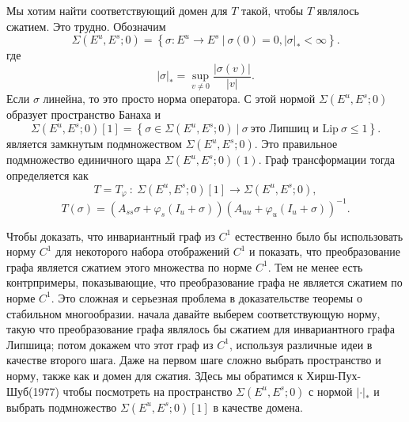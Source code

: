 \begin{demo}
Мы хотим найти соответствующий домен для $T$ такой, чтобы $T$ являлось сжатием. Это трудно. Обозначим
$$
\Sigma(E^u,E^s;0) = \left\{ \sigma: E^u \rightarrow E^s \ | \  \sigma (0) = 0, |\sigma|_* < \infty \right\}.
$$
где 
$$
| \sigma |_* = \sup\limits_{v \neq 0} \frac{|\sigma(v)|}{|v|}.
$$
Если $\sigma$ линейна, то это просто норма оператора. С этой нормой $\Sigma(E^u,E^s;0)$ образует пространство Банаха и
$$
\Sigma(E^u,E^s;0)[1]=\left\{\sigma \in \Sigma(E^u,E^s;0) \ | \ \sigma \ \textrm{это Липшиц и Lip} \ \sigma \leqslant 1 \right\}.
$$
является замкнутым подмножеством $\Sigma(E^u,E^s;0)$. Это правильное подмножество единичного щара $\Sigma(E^u, E^s;0)(1)$. Граф трансформации тогда определяется как
$$
T=T_{\varphi} \ : \ \Sigma(E^u, E^s;0)[1] \rightarrow \Sigma(E^u, E^s;0), 
$$
$$
T(\sigma)=(A_{ss}\sigma + \varphi_s(I_u + \sigma))(A_{uu}+\varphi_u(I_u+\sigma))^{-1}.
$$

\begin{remark}
Чтобы доказать, что инвариантный граф из $C^1$  естественно было бы использовать норму $C^1$ для некоторого набора отображений $C^1$ и показать, что преобразование графа является сжатием этого множества по норме $C^1$.
Тем не менее есть контрпримеры, показывающие, что преобразование графа не является сжатием по норме $C^1$. Это сложная и серьезная проблема в доказательстве теоремы о стабильном многообразии. 
начала давайте выберем соответствующую норму, такую что преобразование графа являлось бы сжатием для инвариантного графа Липшица; потом докажем что этот граф из $C^1$, используя различные идеи в качестве второго шага. Даже на первом шаге сложно выбрать пространство и норму, также как и домен для сжатия. ЗДесь мы обратимся к Хирш-Пух-Шуб(1977) чтобы посмотреть на пространство $\Sigma(E^u, E^s;0)$ с нормой $| \cdot |_*$ и выбрать подмножество $\Sigma(E^u, E^s;0)[1]$ в качестве домена.
\end{remark}




\end{demo}
 



